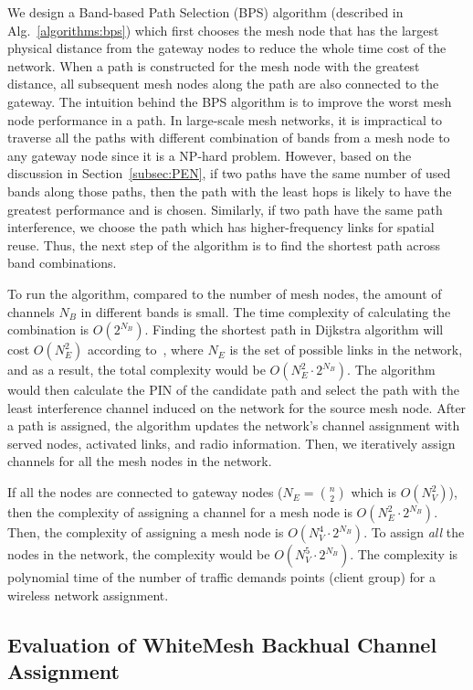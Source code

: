 We design a Band-based Path Selection (BPS) algorithm (described in Alg.~\ref{algorithms:bps}) which 
first chooses the mesh node that has the largest physical distance from the gateway nodes to 
reduce the whole time cost of the network. When a path is constructed for the mesh node with 
the greatest distance, all subsequent mesh nodes along the path are also connected to the gateway. 
The intuition behind the BPS algorithm is to improve the worst mesh node performance in a path.
In large-scale mesh networks, it is impractical to traverse all the paths with different combination 
of bands from a mesh node to any gateway node since it is a NP-hard problem. However, based on the 
discussion in Section~\ref{subsec:PEN}, if two paths have the same number of used bands along those 
paths, then the path with the least hops is likely to have the greatest performance and is chosen. 
Similarly, if two path have the same path interference, we choose the path which has higher-frequency 
links for spatial reuse. Thus, the next step of the algorithm is to find the shortest path across 
band combinations.

To run the algorithm, compared to the number of mesh nodes, the amount of channels $N_B$ in
different bands is small. The time complexity of calculating the combination
is $O(2^{N_B})$. Finding the shortest path in Dijkstra algorithm will
cost $O(N_E^2)$ according to~\cite{golden1976shortest}, where $N_E$ is the set of possible links in the
network, and as a result, the total complexity would be $O(N_E^2\cdot 2^{N_B})$.
The algorithm would then calculate the PIN of the candidate path and select the path
with the least interference channel induced on the network for the source mesh node.
After a path is assigned, the algorithm updates the network's channel assignment
with served nodes, activated links, and radio information. Then,
we iteratively assign channels for all the mesh nodes in the
network.

If all the nodes are connected to gateway nodes ($N_E={n \choose 2}$ which is $O(N_V^2)$), 
then the complexity of assigning a channel for a mesh node is $O(N_E^2\cdot2^{N_B})$. 
Then, the complexity of assigning a mesh node is $O(N_V^4\cdot2^{N_B})$.
To assign {\it all} the nodes in the network, the complexity would 
be $O(N_V^5\cdot2^{N_B})$. The complexity is polynomial time of
the number of traffic demands points (client group) for a wireless
network assignment.


\subsection{Evaluation of WhiteMesh Backhual Channel Assignment}
\label{subsec:whitemeshexperimentdesign}

